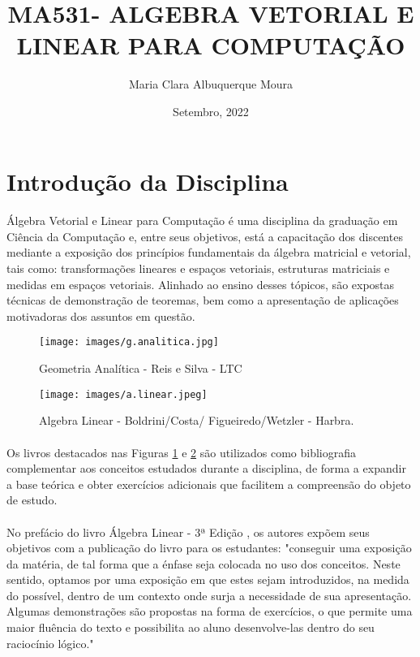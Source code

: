 \documentclass[14pt, a4paper]{article}
\title{MA531- ALGEBRA VETORIAL E LINEAR PARA COMPUTAÇÃO}
\author{Maria Clara Albuquerque Moura}
\date{Setembro, 2022}
\begin{document}
\maketitle
\section{Introdução da Disciplina}
\label{sec:introducao}

\paragraph{}

Álgebra Vetorial e Linear para Computação \citep{MA531} é uma disciplina da graduação em Ciência da Computação e, entre seus objetivos, está a capacitação dos discentes mediante a exposição dos princípios fundamentais da álgebra matricial e vetorial, tais como: transformações lineares e espaços vetoriais, estruturas matriciais e medidas em espaços vetoriais. Alinhado ao ensino desses tópicos, são expostas técnicas de demonstração de teoremas, bem como a apresentação de aplicações motivadoras dos assuntos em questão.

\begin{figure}[ht]
\centering
\texttt{[image: images/g.analitica.jpg]}
\caption{Geometria Analítica - Reis e Silva - LTC}
\label{figura:geometria}
\end{figure}

\begin{figure}[ht]
\centering
\texttt{[image: images/a.linear.jpeg]}
\caption{Algebra Linear - Boldrini/Costa/ Figueiredo/Wetzler - Harbra.}
\label{figura:algebra}
\end{figure}

\paragraph{}

Os livros destacados nas Figuras \ref{figura:geometria} e \ref{figura:algebra} são utilizados como bibliografia complementar aos conceitos estudados durante a disciplina, de forma a expandir a base teórica e obter exercícios adicionais que facilitem a compreensão do objeto de estudo.

\paragraph{}

No prefácio do livro  Álgebra Linear - 3ª Edição \citep{Algebra}, os autores expõem seus objetivos com a publicação do livro para os estudantes: "conseguir uma exposição da matéria, de tal forma que a énfase seja colocada no uso dos conceitos. Neste sentido, optamos por uma exposição em que estes sejam introduzidos, na medida do possível, dentro de um contexto onde surja a necessidade de sua apresentação. Algumas demonstrações são propostas na forma de exercícios, o que permite uma maior fluência do texto e possibilita ao aluno desenvolve-las dentro do seu raciocínio lógico."
 
\end{document}
